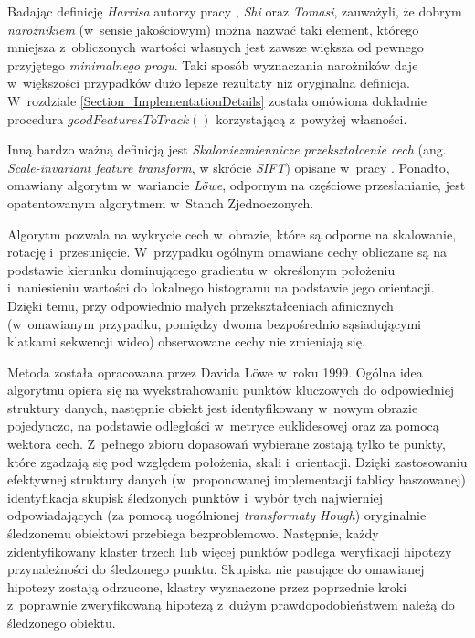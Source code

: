     Badając definicję \textit{Harrisa} autorzy pracy \cite{GoodFeaturesToTrack94}, \textit{Shi} oraz \textit{Tomasi}, zauważyli, że dobrym \textit{narożnikiem} (w~sensie jakościowym) można nazwać taki element, którego mniejsza z~obliczonych wartości własnych jest zawsze większa od pewnego przyjętego \textit{minimalnego progu}. Taki sposób wyznaczania narożników daje w~większości przypadków dużo lepsze rezultaty niż oryginalna definicja. W~rozdziale \ref{Section_ImplementationDetails} została omówiona dokładnie procedura $goodFeaturesToTrack()$ korzystającą z~powyżej własności.

    Inną bardzo ważną definicją jest \textit{Skaloniezmiennicze przekształcenie cech} (ang. \textit{Scale-invariant feature transform}, w skrócie \textit{SIFT}) opisane w~pracy \cite{SalientPointsTracking05}. Ponadto, omawiany algorytm w~wariancie \textit{L\"{o}we}, odpornym na częściowe przesłanianie, jest opatentowanym algorytmem w~Stanch Zjednoczonych.

    Algorytm pozwala na wykrycie cech w~obrazie, które są odporne na skalowanie, rotację i~przesunięcie. W~przypadku ogólnym omawiane cechy obliczane są na podstawie kierunku dominującego gradientu w~określonym położeniu i~naniesieniu wartości do lokalnego histogramu na podstawie jego orientacji. Dzięki temu, przy odpowiednio małych przekształceniach afinicznych (w~omawianym przypadku, pomiędzy dwoma bezpośrednio sąsiadującymi klatkami sekwencji wideo) obserwowane cechy nie zmieniają się.

    Metoda została opracowana przez Davida L\"{o}we w~roku 1999. Ogólna idea algorytmu opiera się na wyekstrahowaniu punktów kluczowych do odpowiedniej struktury danych, następnie obiekt jest identyfikowany w~nowym obrazie pojedynczo, na podstawie odległości w~metryce euklidesowej oraz za pomocą wektora cech. Z~pełnego zbioru dopasowań wybierane zostają tylko te punkty, które zgadzają się pod względem położenia, skali i~orientacji. Dzięki zastosowaniu efektywnej struktury danych (w~proponowanej implementacji tablicy haszowanej) identyfikacja skupisk śledzonych punktów i~wybór tych najwierniej odpowiadających (za pomocą uogólnionej \textit{transformaty Hough}) oryginalnie śledzonemu obiektowi przebiega bezproblemowo. Następnie, każdy zidentyfikowany klaster trzech lub więcej punktów podlega weryfikacji hipotezy przynależności do śledzonego punktu. Skupiska nie pasujące do omawianej hipotezy zostają odrzucone, klastry wyznaczone przez poprzednie kroki z~poprawnie zweryfikowaną hipotezą z~dużym prawdopodobieństwem należą do śledzonego obiektu.

